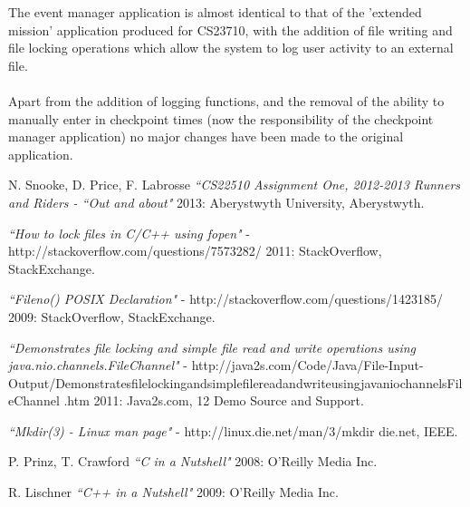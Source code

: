 \documentclass[a4paper, 10pt]{article}
\begin{document}
The event manager application is almost identical to that of the 'extended mission' application produced for CS23710, with the addition of file writing and file locking operations which allow the system to log user activity to an external file. \\\\
Apart from the addition of logging functions, and the removal of the ability to manually enter in checkpoint times (now the responsibility of the checkpoint manager application) no major changes have been made to the original application. 



\begin{thebibliography}{1}

   N. Snooke, D. Price, F. Labrosse {\em ``CS22510 Assignment One, 2012-2013 Runners and Riders - ``Out and about"} 2013: Aberystwyth University, Aberystwyth.
 
  {\em ``How to lock files in C/C++ using fopen"}  - http://stackoverflow.com/questions/7573282/ 2011: StackOverflow, StackExchange.
 
   {\em ``Fileno() POSIX Declaration"}  - http://stackoverflow.com/questions/1423185/ 2009: StackOverflow, StackExchange.
 
   {\em ``Demonstrates file locking and simple file read and write operations using java.nio.channels.FileChannel"}  - http://java2s.com/Code/Java/File-Input-Output/DemonstratesfilelockingandsimplefilereadandwriteusingjavaniochannelsFileChannel .htm 2011: Java2s.com, 12 Demo Source and Support.
  
   {\em ``Mkdir(3) - Linux man page"}  - http://linux.die.net/man/3/mkdir die.net, IEEE.
 
   P. Prinz, T. Crawford {\em ``C in a Nutshell"} 2008: O'Reilly Media Inc.
  
   R. Lischner {\em ``C++ in a Nutshell"} 2009: O'Reilly Media Inc.
  
\end{thebibliography}
\end{document}
